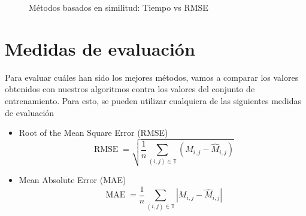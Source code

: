\documentclass[spanish]{article}                 %
\numberwithin{equation}{section}                 %
\theoremstyle{definition}
\DeclareMathOperator{\RMSE}{RMSE}
\DeclareMathOperator{\MAE}{MAE}
\begin{document}
\begin{figure}[htb]

    \caption{Métodos basados en similitud: Tiempo vs RMSE}\label{fig:resultados_similitud}
\end{figure}


\section{Medidas de evaluación}
Para evaluar cuáles han sido los mejores métodos, vamos a comparar los valores obtenidos con nuestros algoritmos contra los valores del conjunto de entrenamiento. Para esto, se pueden utilizar cualquiera de las siguientes medidas de evaluación
\begin{itemize}
    \item Root of the Mean Square Error (RMSE)
        \begin{equation}
            \RMSE = \sqrt{\frac{1}{n} \sum_{(i, j) \in \mathds{T}} (M_{i, j} - \hat M_{i, j})}
        \end{equation}
    \item Mean Absolute Error (MAE)
        \begin{equation}
            \MAE = \frac{1}{n} \sum_{(i, j) \in \mathds{T}} |M_{i, j} - \hat M_{i, j}|
        \end{equation}
\end{itemize}
\end{document}
